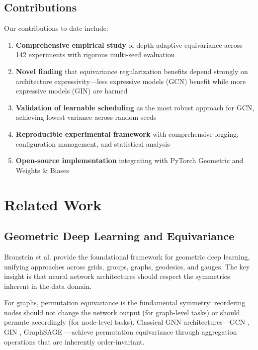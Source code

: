 \documentclass[11pt,a4paper]{article}
\begin{document}
\subsection{Contributions}

Our contributions to date include:

\begin{enumerate}
    \item \textbf{Comprehensive empirical study} of depth-adaptive equivariance across 142 experiments with rigorous multi-seed evaluation
    
    \item \textbf{Novel finding} that equivariance regularization benefits depend strongly on architecture expressivity---less expressive models (GCN) benefit while more expressive models (GIN) are harmed
    
    \item \textbf{Validation of learnable scheduling} as the most robust approach for GCN, achieving lowest variance across random seeds
    
    \item \textbf{Reproducible experimental framework} with comprehensive logging, configuration management, and statistical analysis
    
    \item \textbf{Open-source implementation} integrating with PyTorch Geometric and Weights \& Biases
\end{enumerate}

\section{Related Work}

\subsection{Geometric Deep Learning and Equivariance}

Bronstein et al. \cite{bronstein2021geometric} provide the foundational framework for geometric deep learning, unifying approaches across grids, groups, graphs, geodesics, and gauges. The key insight is that neural network architectures should respect the symmetries inherent in the data domain.

For graphs, permutation equivariance is the fundamental symmetry: reordering nodes should not change the network output (for graph-level tasks) or should permute accordingly (for node-level tasks). Classical GNN architectures---GCN \cite{kipf2017gcn}, GIN \cite{xu2019gin}, GraphSAGE \cite{hamilton2017graphsage}---achieve permutation equivariance through aggregation operations that are inherently order-invariant.
\end{document}
